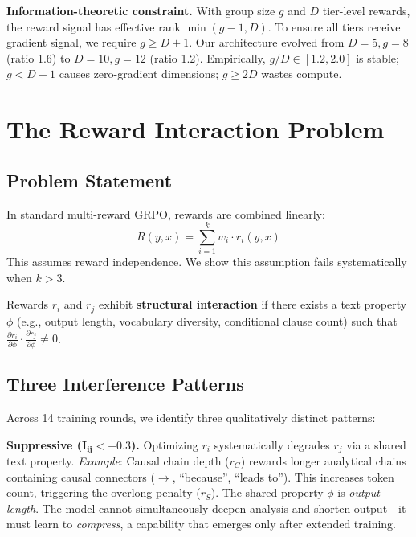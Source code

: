 \documentclass[sigconf]{acmart}
\begin{document}
\textbf{Information-theoretic constraint.} With group size $g$ and $D$ tier-level rewards, the reward signal has effective rank $\min(g-1, D)$. To ensure all tiers receive gradient signal, we require $g \geq D + 1$. Our architecture evolved from $D=5, g=8$ (ratio 1.6) to $D=10, g=12$ (ratio 1.2). Empirically, $g/D \in [1.2, 2.0]$ is stable; $g < D+1$ causes zero-gradient dimensions; $g \geq 2D$ wastes compute.

\section{The Reward Interaction Problem}
\label{sec:rip}

\subsection{Problem Statement}

In standard multi-reward GRPO, rewards are combined linearly:
\begin{equation}
    R(y, x) = \sum_{i=1}^{k} w_i \cdot r_i(y, x)
    \label{eq:linear}
\end{equation}
This assumes reward independence. We show this assumption fails systematically when $k > 3$.

\begin{definition}
\label{def:rip}
Rewards $r_i$ and $r_j$ exhibit \textbf{structural interaction} if there exists a text property $\phi$ (e.g., output length, vocabulary diversity, conditional clause count) such that $\frac{\partial r_i}{\partial \phi} \cdot \frac{\partial r_j}{\partial \phi} \neq 0$.
\end{definition}

\subsection{Three Interference Patterns}

Across 14 training rounds, we identify three qualitatively distinct patterns:

\textbf{Suppressive ($\mathbf{I_{ij} < -0.3}$).} Optimizing $r_i$ systematically degrades $r_j$ via a shared text property. \textit{Example}: Causal chain depth ($r_C$) rewards longer analytical chains containing causal connectors ($\rightarrow$, ``because'', ``leads to''). This increases token count, triggering the overlong penalty ($r_S$). The shared property $\phi$ is \textit{output length}. The model cannot simultaneously deepen analysis and shorten output---it must learn to \textit{compress}, a capability that emerges only after extended training.
\end{document}
